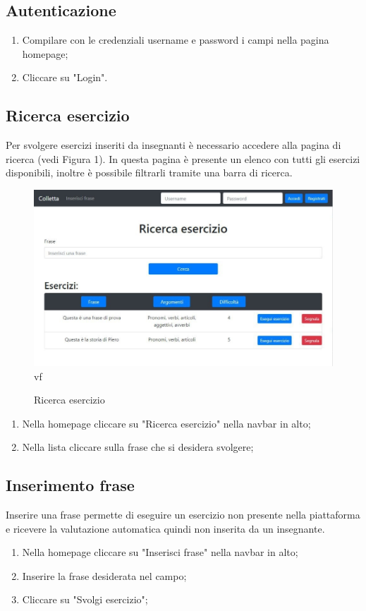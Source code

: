 \documentclass[11pt,a4paper]{article}
\begin{document}
{	\subsection{Autenticazione}
	\begin{enumerate}
		\item Compilare con le credenziali username e password i campi nella pagina homepage;
		\item Cliccare su "Login".
	\end{enumerate}

	\subsection{Ricerca esercizio}
	Per svolgere esercizi inseriti da insegnanti è necessario accedere alla pagina di ricerca (vedi Figura 1). In questa pagina è presente un elenco con tutti gli esercizi disponibili, inoltre è possibile filtrarli tramite una barra di ricerca.
	
	\begin{figure}[h]
		\centering
		\includegraphics[scale=0.65]{images/ricerca.jpg}vf
		\caption{Ricerca esercizio}
	\end{figure}

	\begin{enumerate}
		\item Nella homepage cliccare su "Ricerca esercizio" nella navbar in alto;
		\item Nella lista cliccare sulla frase che si desidera svolgere;
	\end{enumerate}
	
	\subsection{Inserimento frase}
	Inserire una frase permette di eseguire un esercizio non presente nella piattaforma e ricevere la valutazione automatica quindi non inserita da un insegnante.	
	\begin{enumerate}
		\item Nella homepage cliccare su "Inserisci frase" nella navbar in alto;
		\item Inserire la frase desiderata nel campo;
		\item Cliccare su "Svolgi esercizio";


\end{enumerate}}
\end{document}
